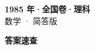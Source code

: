 \documentclass[zihao=-4, a4paper]{ctexart}
\begin{document}
\begin{center}
  {\Large\bfseries 1985 年·全国卷·理科}\\[4pt]
  {\large 数学 · 简答版}
\end{center}
\medskip
{}

\clearpage
{}
\begin{center}{\Large\bfseries 答案速查}\end{center}
\medskip

\end{document}
